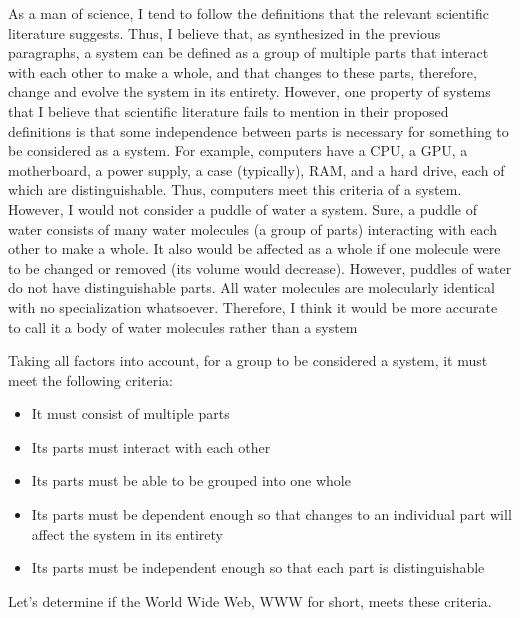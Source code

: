 \documentclass[11pt]{article}
\begin{document}
\par As a man of science, I tend to follow the definitions that the relevant scientific literature suggests. Thus, I believe that, as synthesized in the previous paragraphs, a system can be defined as a group of multiple parts that interact with each other to make a whole, and that changes to these parts, therefore, change and evolve the system in its entirety. However, one property of systems that I believe that scientific literature fails to mention in their proposed definitions is that some independence between parts is necessary for something to be considered as a system. For example, computers have a CPU, a GPU, a motherboard, a power supply, a case (typically), RAM, and a hard drive, each of which are distinguishable. Thus, computers meet this criteria of a system. However, I would not consider a puddle of water a system. Sure, a puddle of water consists of many water molecules (a group of parts) interacting with each other to make a whole. It also would be affected as a whole if one molecule were to be changed or removed (its volume would decrease). However, puddles of water do not have distinguishable parts. All water molecules are molecularly identical with no specialization whatsoever. Therefore, I think it would be more accurate to call it a body of water molecules rather than a system
\par Taking all factors into account, for a group to be considered a system, it must meet the following criteria:
\begin{itemize}
\item It must consist of multiple parts
\item Its parts must interact with each other
\item Its parts must be able to be grouped into one whole
\item Its parts must be dependent enough so that changes to an individual part will affect the system in its entirety
\item Its parts must be independent enough so that each part is distinguishable
\end{itemize}
\par Let’s determine if the World Wide Web, WWW for short, meets these criteria. 
\end{document}
